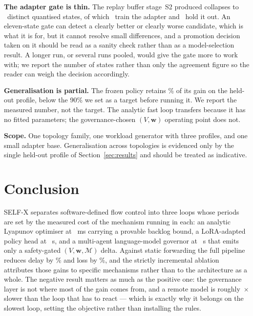 \documentclass[conference]{IEEEtran}
\newcommand{\wvec}{\mathbf{w}}
\begin{document}
\textbf{The adapter gate is thin.} The replay buffer stage~S2 produced collapses
to \ResAdapterStates\ distinct quantised states, of which \ResAdapterTrainStates\
train the adapter and \ResAdapterGateStates\ hold it out. An eleven-state gate can
detect a clearly better or clearly worse candidate, which is what it is for, but
it cannot resolve small differences, and a promotion decision taken on it should
be read as a sanity check rather than as a model-selection result. A longer run,
or several runs pooled, would give the gate more to work with; we report the
number of states rather than only the agreement figure so the reader can weigh
the decision accordingly.

\textbf{Generalisation is partial.} The frozen policy retains
\ResTransferRetention\% of its gain on the held-out profile, below the 90\% we set
as a target before running it. We report the measured number, not the target. The
analytic fast loop transfers because it has no fitted parameters; the
governance-chosen $(V,\wvec)$ operating point does not.

\textbf{Scope.} One topology family, one workload generator with three profiles, and
one small adapter base. Generalisation across topologies is evidenced only by the
single held-out profile of Section~\ref{sec:results} and should be treated as
indicative.

\section{Conclusion}

SELF-X separates software-defined flow control into three loops whose periods are
set by the measured cost of the mechanism running in each: an analytic Lyapunov
optimiser at \ResTauMs~ms carrying a provable backlog bound, a LoRA-adapted policy
head at \ResWindowSec~s, and a multi-agent language-model governor at
\ResEpochSec~s that emits only a safety-gated $(V,\wvec,\mathcal{M})$ delta. Against
static forwarding the full pipeline reduces delay by \ResLatVsStatic\% and loss by
\ResLossVsStatic\%, and the strictly incremental ablation attributes those gains to
specific mechanisms rather than to the architecture as a whole. The negative result
matters as much as the positive one: the governance layer is not where most of the
gain comes from, and a remote model is roughly \ResSpeedup\,$\times$ slower than
the loop that has to react --- which is exactly why it belongs on the slowest
loop, setting the objective rather than installing the rules.
\end{document}
